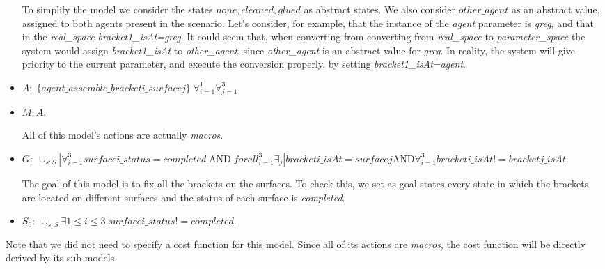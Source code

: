 \begin{itemize}
		To simplify the model we consider the states $none,cleaned,glued$ as abstract states. We also consider $other\_agent$ as an abstract value, assigned to both agents present in the scenario. Let's consider, for example, that the instance of the \textit{agent} parameter is \textit{greg}, and that in the \textit{real\_space} \textit{bracket1\_isAt=greg}. It could seem that, when converting from converting from \textit{real\_space} to \textit{parameter\_space} the system would assign \textit{bracket1\_isAt} to \textit{other\_agent}, since \textit{other\_agent} is an abstract value for \textit{greg}. In reality, the system will give priority to the current parameter, and execute the conversion properly, by setting \textit{bracket1\_isAt=agent}. 
	\item $A:\;\{agent\_assemble\_bracketi\_surfacej\}\;\forall_{i=1}^1 \forall_{j=1}^3$.
	\item $M: A$.

	All of this model's actions are actually \textit{macros}.
	\item $G:\; \cup_{s:S} | \forall_{i=1}^3 surfacei\_status=completed\;\text{AND}\;forall_{i=1}^3\exists_{j}|bracketi\_isAt=surfacej \text{AND} \forall_{i=1}^3 bracketi\_isAt!=bracketj\_isAt.$

	The goal of this model is to fix all the brackets on the surfaces. To check this, we set as goal states every state in which the brackets are located on different surfaces and the status of each surface is \textit{completed}. 
	\item $S_0:\; \cup_{s:S} \exists{1\leq i \leq 3} | surfacei\_status!=completed$.

\end{itemize}

Note that we did not need to specify a cost function for this model. Since all of its actions are \textit{macros}, the cost function will be directly derived by its sub-models.

